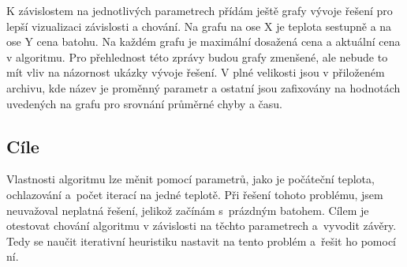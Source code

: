 \documentclass[11pt]{article}
\begin{document}
K závislostem na jednotlivých parametrech přídám ještě grafy vývoje řešení pro lepší vizualizaci závislosti a chování. Na grafu na ose X je teplota sestupně a na ose Y cena batohu. Na každém grafu je maximální dosažená cena a aktuální cena v algoritmu. Pro přehlednost této zprávy budou grafy zmenšené, ale nebude to mít vliv na názornost ukázky vývoje řešení. V plné velikosti jsou v přiloženém archivu, kde název je proměnný parametr a ostatní jsou zafixovány na hodnotách uvedených na grafu pro srovnání průměrné chyby a času.
 
\subsection{Cíle}

Vlastnosti algoritmu lze měnit pomocí parametrů, jako je počáteční teplota, ochlazování a~počet iterací na jedné teplotě. Při řešení tohoto problému, jsem neuvažoval neplatná řešení, jelikož začínám s~prázdným batohem. Cílem je otestovat chování algoritmu v závislosti na těchto parametrech a~vyvodit závěry. Tedy se naučit iterativní heuristiku nastavit na tento problém a~řešit ho pomocí ní. 
\end{document}
